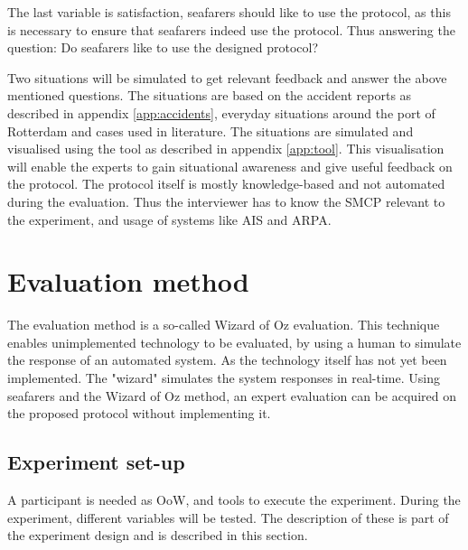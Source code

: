 The last variable is satisfaction, seafarers should like to use the protocol, as this is necessary to ensure that seafarers indeed use the protocol. Thus answering the question: Do seafarers like to use the designed protocol?

Two situations will be simulated to get relevant feedback and answer the above mentioned questions. The situations are based on the accident reports as described in appendix \ref{app:accidents}, everyday situations around the port of Rotterdam and cases used in literature. The situations are simulated and visualised using the tool as described in appendix \ref{app:tool}. This visualisation will enable the experts to gain situational awareness and give useful feedback on the protocol. The protocol itself is mostly knowledge-based and not automated during the evaluation. Thus the interviewer has to know the \acf{SMCP} relevant to the experiment, and usage of systems like \acf{AIS} and \acf{ARPA}.


\section{Evaluation method}
The evaluation method is a so-called Wizard of Oz evaluation. This technique enables unimplemented technology to be evaluated, by using a human to simulate the response of an automated system. As the technology itself has not yet been implemented. The "wizard" simulates the system responses in real-time. Using seafarers and the Wizard of Oz method, an expert evaluation can be acquired on the proposed protocol without implementing it.

\subsection{Experiment set-up}
A participant is needed as \acf{OoW}, and tools to execute the experiment. During the experiment, different variables will be tested. The description of these is part of the experiment design and is described in this section.

